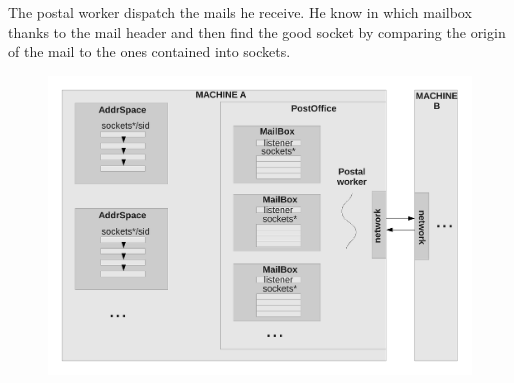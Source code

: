 The postal worker dispatch the mails he receive. He know in which mailbox
thanks to the mail header and then find the good socket by comparing the origin
of the mail to the ones contained into sockets.

\begin{figure}[H]
	\centering
		\includegraphics[scale=0.55]{networkschema}
\end{figure}
